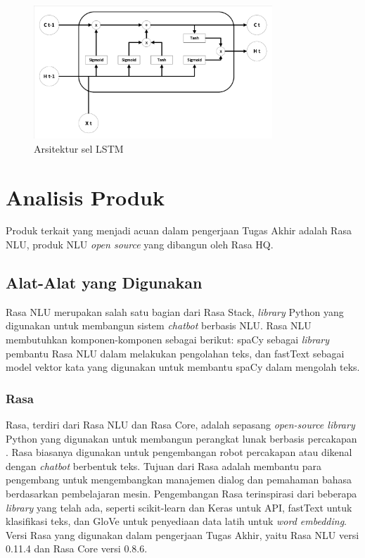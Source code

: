 \begin{figure}[H]
	\centering
	\includegraphics[width=0.8\textwidth, trim=2 2 2 2, clip]{resources/2/lstm.pdf}
	\caption{Arsitektur sel LSTM}
	\label{fig:lstm}
\end{figure}

\section{Analisis Produk}

Produk terkait yang menjadi acuan dalam pengerjaan Tugas Akhir adalah Rasa NLU, produk NLU \textit{open source} yang dibangun oleh Rasa HQ.

\subsection{Alat-Alat yang Digunakan}

Rasa NLU merupakan salah satu bagian dari Rasa Stack, \textit{library} Python yang digunakan untuk membangun sistem \textit{chatbot} berbasis NLU. Rasa NLU membutuhkan komponen-komponen sebagai berikut: spaCy sebagai \textit{library} pembantu Rasa NLU dalam melakukan pengolahan teks, dan fastText sebagai model vektor kata yang digunakan untuk membantu spaCy dalam mengolah teks.

\subsubsection{Rasa}

Rasa, terdiri dari Rasa NLU dan Rasa Core, adalah sepasang \textit{open-source library} Python yang digunakan untuk membangun perangkat lunak berbasis percakapan \parencite{bocklisch2017rasa}. Rasa biasanya digunakan untuk pengembangan robot percakapan atau dikenal dengan \textit{chatbot} berbentuk teks. Tujuan dari Rasa adalah membantu para pengembang untuk mengembangkan manajemen dialog dan pemahaman bahasa berdasarkan pembelajaran mesin. Pengembangan Rasa terinspirasi dari beberapa \textit{library} yang telah ada, seperti scikit-learn dan Keras untuk API, fastText untuk klasifikasi teks, dan GloVe untuk penyediaan data latih untuk \textit{word embedding}. Versi Rasa yang digunakan dalam pengerjaan Tugas Akhir, yaitu Rasa NLU versi 0.11.4 dan Rasa Core versi 0.8.6.

